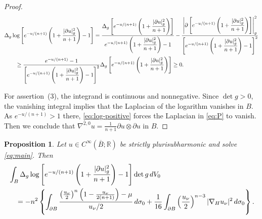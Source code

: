\documentclass[11pt]{article}
\newtheorem{proposition}[theorem]{Proposition}
\newcommand{\R}{\mathbb R}
\begin{document}
\begin{proof}
{\small
\begin{align}
 &\Delta_g\log\left[e^{-u/(n+1)}\left(1+\frac{|\partial u|_g^2}{n+1}\right)-1\right]=\frac{\displaystyle\Delta_g\left[e^{-u/(n+1)}\left(1+\frac{|\partial u|_g^2}{n+1}\right)\right]}
 {\displaystyle e^{-u/(n+1)}\left(1+\frac{|\partial u|_g^2}{n+1}\right)-1}-\frac{\displaystyle
       \left|\partial\left[e^{-u/(n+1)}\left(1+\frac{|\partial u|_g^2}{n+1}\right)\right]\right|_g^2}
 {\displaystyle\left[e^{-u/(n+1)}\left(1+\frac{|\partial u|_g^2}{n+1}\right)-1\right]^2}\notag\\
 &\quad \quad\ge\frac{e^{-u/(n+1)}-1}{\displaystyle\left[e^{-u/(n+1)}\left(1+\frac{|\partial u|_g^2}{n+1}\right)-1\right]^2}
       \Delta_g\left[e^{-u/(n+1)}\left(1+\frac{|\partial u|_g^2}{n+1}\right)\right]\ge0.\label{eq:log-positive}
\end{align}}

For assertion~(3), the integrand is continuous and nonnegative.
Since $\det g>0$, the vanishing integral implies that the Laplacian
of the logarithm vanishes in $B$. As $e^{-u/(n+1)}>1$ there,
\eqref{eq:log-positive} forces the Laplacian in \eqref{eq:P}
to vanish. Then we conclude that
$\nabla^{2,0}u=\frac1{n+1}\partial u\otimes\partial u$ in $B$.
\end{proof}

\begin{proposition}\label{prop:log-flux}
Let $u\in C^\infty(\overline B;\R)$ be strictly plurisubharmonic
and solve \eqref{eq:main}. Then
\begin{align}
 &\int_B\Delta_g\log\left[e^{-u/(n+1)}\left(1+\frac{|\partial u|_g^2}{n+1}\right)-1\right]\det g\,dV_0\notag\\
 &\quad=-n^2\left\{
 \int_{\partial B}\frac{
 \left(\frac{u_\nu}{2}\right)^n\left(1-\frac{u_\nu}{2(n+1)}\right)-\mu}
 {u_\nu/2}\,d\sigma_0
 +\frac1{16}\int_{\partial B}
 \left(\frac{u_\nu}{2}\right)^{n-3}|\nabla_Hu_\nu|^2\,d\sigma_0
 \right\}.\label{eq:log-flux}
\end{align}
\end{proposition}
\end{document}
